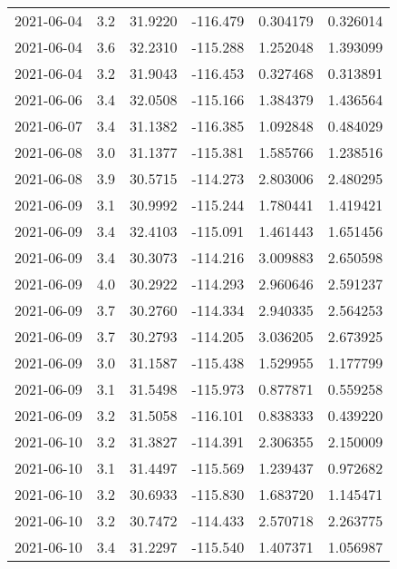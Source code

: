 \begin{tabular}{lrrrrr}
2021-06-04 &       3.2 &  31.9220 &  -116.479 &         0.304179 &         0.326014 \\
2021-06-04 &       3.6 &  32.2310 &  -115.288 &         1.252048 &         1.393099 \\
2021-06-04 &       3.2 &  31.9043 &  -116.453 &         0.327468 &         0.313891 \\
2021-06-06 &       3.4 &  32.0508 &  -115.166 &         1.384379 &         1.436564 \\
2021-06-07 &       3.4 &  31.1382 &  -116.385 &         1.092848 &         0.484029 \\
2021-06-08 &       3.0 &  31.1377 &  -115.381 &         1.585766 &         1.238516 \\
2021-06-08 &       3.9 &  30.5715 &  -114.273 &         2.803006 &         2.480295 \\
2021-06-09 &       3.1 &  30.9992 &  -115.244 &         1.780441 &         1.419421 \\
2021-06-09 &       3.4 &  32.4103 &  -115.091 &         1.461443 &         1.651456 \\
2021-06-09 &       3.4 &  30.3073 &  -114.216 &         3.009883 &         2.650598 \\
2021-06-09 &       4.0 &  30.2922 &  -114.293 &         2.960646 &         2.591237 \\
2021-06-09 &       3.7 &  30.2760 &  -114.334 &         2.940335 &         2.564253 \\
2021-06-09 &       3.7 &  30.2793 &  -114.205 &         3.036205 &         2.673925 \\
2021-06-09 &       3.0 &  31.1587 &  -115.438 &         1.529955 &         1.177799 \\
2021-06-09 &       3.1 &  31.5498 &  -115.973 &         0.877871 &         0.559258 \\
2021-06-09 &       3.2 &  31.5058 &  -116.101 &         0.838333 &         0.439220 \\
2021-06-10 &       3.2 &  31.3827 &  -114.391 &         2.306355 &         2.150009 \\
2021-06-10 &       3.1 &  31.4497 &  -115.569 &         1.239437 &         0.972682 \\
2021-06-10 &       3.2 &  30.6933 &  -115.830 &         1.683720 &         1.145471 \\
2021-06-10 &       3.2 &  30.7472 &  -114.433 &         2.570718 &         2.263775 \\
2021-06-10 &       3.4 &  31.2297 &  -115.540 &         1.407371 &         1.056987 \\

\end{tabular}
